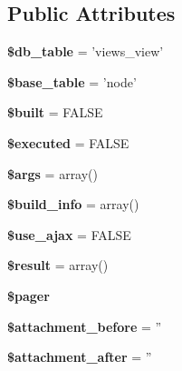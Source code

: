 \subsection*{Public Attributes}
\begin{CompactItemize}
\item 
\hypertarget{classview_a021eaf45fa9c47aeecacd1d4d4fd1ae}{
\textbf{\$db\_\-table} = 'views\_\-view'}
\label{classview_a021eaf45fa9c47aeecacd1d4d4fd1ae}

\item 
\hypertarget{classview_a38dcbd852fcf35c52640d872825db05}{
\textbf{\$base\_\-table} = 'node'}
\label{classview_a38dcbd852fcf35c52640d872825db05}

\item 
\hypertarget{classview_130fff8fccc8b8c2e6dde0ce2d21aa97}{
\textbf{\$built} = FALSE}
\label{classview_130fff8fccc8b8c2e6dde0ce2d21aa97}

\item 
\hypertarget{classview_1990dbcf0973d9d660159fd88b5e3104}{
\textbf{\$executed} = FALSE}
\label{classview_1990dbcf0973d9d660159fd88b5e3104}

\item 
\hypertarget{classview_dae31e7d2060a472acc0efb5f34ff304}{
\textbf{\$args} = array()}
\label{classview_dae31e7d2060a472acc0efb5f34ff304}

\item 
\hypertarget{classview_26d81032570035c8f0a595f2d259f857}{
\textbf{\$build\_\-info} = array()}
\label{classview_26d81032570035c8f0a595f2d259f857}

\item 
\hypertarget{classview_24f5a67c77e0c87866714e13c7ed4822}{
\textbf{\$use\_\-ajax} = FALSE}
\label{classview_24f5a67c77e0c87866714e13c7ed4822}

\item 
\hypertarget{classview_d3a28569dba900a942bec6bd5eb74237}{
\textbf{\$result} = array()}
\label{classview_d3a28569dba900a942bec6bd5eb74237}

\item 
\textbf{\$pager}
\item 
\hypertarget{classview_c6aa0ed91545d9b07a07d388dc8fbaa4}{
\textbf{\$attachment\_\-before} = ''}
\label{classview_c6aa0ed91545d9b07a07d388dc8fbaa4}

\item 
\hypertarget{classview_43e9271615c7bca48b8c9abf1cd161d0}{
\textbf{\$attachment\_\-after} = ''}
\label{classview_43e9271615c7bca48b8c9abf1cd161d0}


\end{CompactItemize}
